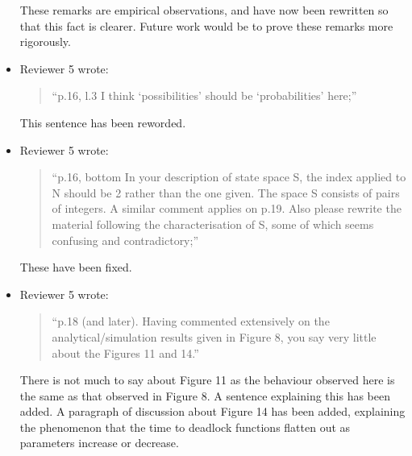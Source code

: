 \documentclass{article}
\begin{document}
\begin{itemize}
These remarks are empirical observations, and have now been rewritten so that
this fact is clearer. Future work would be to prove these remarks more
rigorously.

\item Reviewer 5 wrote:
\begin{quote}
``p.16, l.3 I think ‘possibilities’ should be ‘probabilities’ here;''
\end{quote}

This sentence has been reworded.


\item Reviewer 5 wrote:
\begin{quote}
``p.16, bottom In your description of state space S, the index applied to N
should be 2 rather than the one given. The space S consists of pairs of
integers. A similar comment applies on p.19. Also please rewrite the material
following the characterisation of S, some of which seems confusing and
contradictory;''
\end{quote}

These have been fixed.


\item Reviewer 5 wrote:
\begin{quote}
``p.18 (and later). Having commented extensively on the analytical/simulation
results given in Figure 8, you say very little about the Figures 11 and 14.''
\end{quote}

There is not much to say about Figure 11 as the behaviour observed here is the
same as that observed in Figure 8. A sentence explaining this has been added.
A paragraph of discussion about Figure 14 has been added, explaining the
phenomenon that the time to deadlock functions flatten out as parameters
increase or decrease.


\end{itemize}
\end{document}
